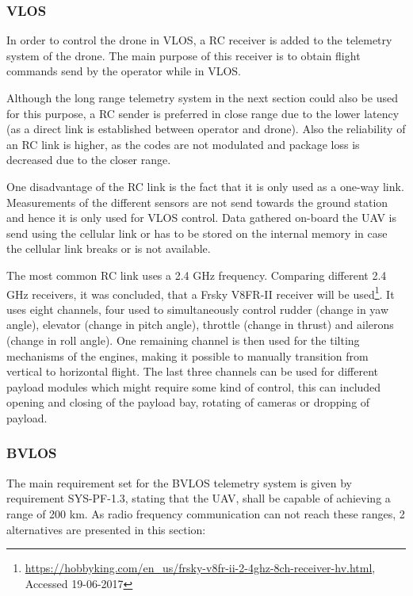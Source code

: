 
\subsubsection{VLOS}

In order to control the drone in VLOS, a RC receiver is added to the telemetry system of the drone. The main purpose of this receiver is to obtain flight commands send by the operator while in VLOS. 

Although the long range telemetry system in the next section could also be used for this purpose, a RC sender is preferred in close range due to the lower latency (as a direct link is established between operator and drone). Also the reliability of an RC link is higher, as the codes are not modulated and package loss is decreased due to the closer range.     

One disadvantage of the RC link is the fact that it is only used as a one-way link. Measurements of the different sensors are not send towards the ground station and hence it is only used for VLOS control. Data gathered on-board the UAV is send using the cellular link or has to be stored on the internal memory in case the cellular link breaks or is not available.

The most common RC link uses a 2.4 GHz frequency. Comparing different 2.4 GHz receivers, it was concluded, that a Frsky V8FR-II receiver will be used\footnote{\url{https://hobbyking.com/en_us/frsky-v8fr-ii-2-4ghz-8ch-receiver-hv.html}, Accessed 19-06-2017}. It uses eight channels, four used to simultaneously control rudder (change in yaw angle), elevator (change in pitch angle), throttle (change in thrust) and ailerons (change in roll angle). One remaining channel is then used for the tilting mechanisms of the engines, making it possible to manually transition from vertical to horizontal flight. The last three channels can be used for different payload modules which might require some kind of control, this can included opening and closing of the payload bay, rotating of cameras or dropping of payload.




\subsubsection{BVLOS}

The main requirement set for the BVLOS telemetry system is given by requirement SYS-PF-1.3, stating that the UAV, shall be capable of achieving a range of 200 km. As radio frequency communication can not reach these ranges, 2 alternatives are presented in this section: 




